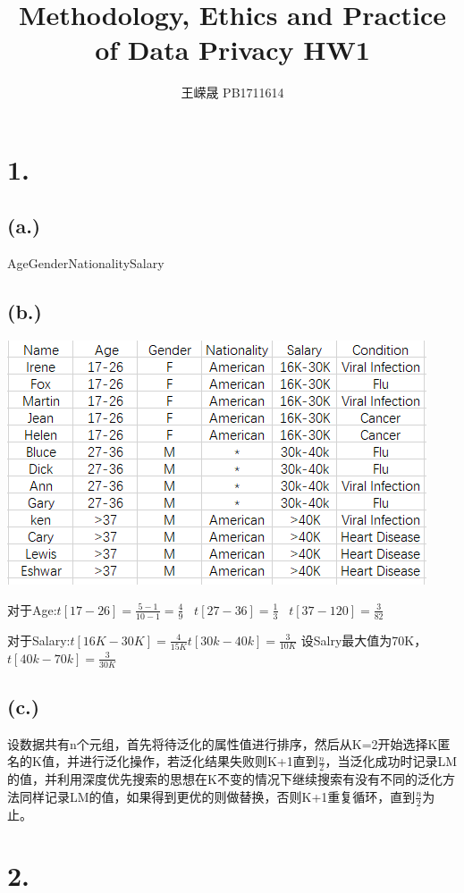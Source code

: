 \documentclass{article}
\title{Methodology, Ethics and Practice of
	Data Privacy
HW1}
\author{王嵘晟 \quad PB1711614}
\date{}
\begin{document}
	\maketitle
	\section*{1.}
	\subsection*{(a.)}
	\par{Age\qquad Gender\qquad Nationality\qquad Salary}
	\subsection*{(b.)}
	\includegraphics*[scale=0.75]{2.png}
	\par{对于Age:\quad $t[17-26]=\frac{5-1}{10-1}=\frac{4}{9}$ \
		 $t[27-36]=\frac{1}{3} $ \
	 	 $t[37-120]=\frac{3}{82}$}	
 	 \par{对于Salary:\quad $t[16K-30K]=\frac{4}{15K}
 	 	t[30k-40k]=\frac{3}{10K}$
  	设Salry最大值为70K，$t[40k-70k]=\frac{3}{30K}$}
	\subsection*{(c.)}
	\par{设数据共有n个元组，首先将待泛化的属性值进行排序，然后从K=2开始选择K匿名的K值，并进行泛化操作，若泛化结果失败则K+1直到$\frac{n}{2}$，当泛化成功时记录LM的值，并利用深度优先搜索的思想在K不变的情况下继续搜索有没有不同的泛化方法同样记录LM的值，如果得到更优的则做替换，否则K+1重复循环，直到$\frac{n}{2}$为止。}
	\section*{2.}
\end{document}
